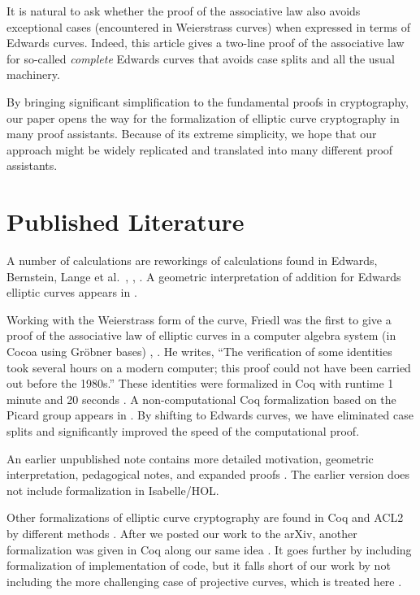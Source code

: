 \documentclass{llncs}
\begin{document}
It is natural to ask whether the proof of the associative law also
avoids exceptional cases (encountered in Weierstrass curves)
when expressed in terms of Edwards curves.
Indeed, this article gives a two-line proof of the associative law for
so-called \emph{complete} Edwards curves that avoids case splits and all
the usual machinery.

By bringing significant simplification to the fundamental proofs in
cryptography, our paper opens the way for the formalization of
elliptic curve cryptography in many proof assistants.  Because of its
extreme simplicity, we hope that our approach might be widely replicated
and translated into many different proof assistants.

\section{Published Literature}

A number of calculations are reworkings of calculations found in
Edwards, Bernstein, Lange et al.~\cite{edwards2007normal},
\cite{bernstein2008twisted}, \cite{bernstein2007faster}.  A geometric
interpretation of addition for Edwards elliptic curves appears in
\cite{arene2011faster}.

Working with the Weierstrass form of the curve, Friedl was the first
to give a proof of the associative law of elliptic curves in a
computer algebra system (in Cocoa using Gr\"obner bases)
\cite{friedl}, \cite{friedl2017elementary}.  He writes, ``The
verification of some identities took several hours on a modern
computer; this proof could not have been carried out before the
1980s.''  These identities were formalized in Coq with runtime 1
minute and 20 seconds \cite{thery2007proving}.  A non-computational
Coq formalization based on the Picard group appears in
\cite{bartzia2014formal}.  By shifting to Edwards curves, we have
eliminated case splits and significantly improved the speed of the
computational proof.

An earlier unpublished note contains more detailed motivation,
geometric interpretation, pedagogical notes, and expanded proofs
\cite{hales2016group}.  The earlier version does not include
formalization in Isabelle/HOL.

Other formalizations of elliptic curve cryptography are found in Coq
and ACL2 by different methods \cite{russinoff2017computationally}.
After we posted our work to the arXiv, another formalization was given in Coq
along our same idea \cite{erbsen2017crafting}.  It goes further by including
formalization of implementation of code, 
but it falls short of our work by not including the more
challenging case of projective curves, which is treated here
\cite{erbsen2017systematic}.
\end{document}
